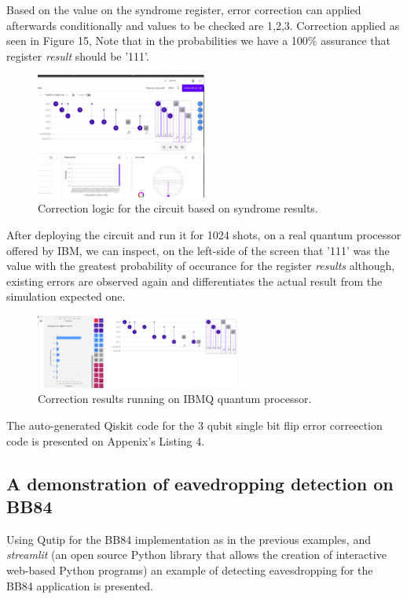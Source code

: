 \documentclass[12pt]{ieeetj}
\begin{document}
		Based on the value on the syndrome register, error correction can applied afterwards conditionally and values to be
		checked are {1,2,3}.
		Correction applied as seen in Figure 15,
		Note that in the probabilities we have a 100\% assurance that register \textit{result} should be '111'.
		\begin{figure}[H]
			\centering
			\includegraphics[width=0.5\textwidth]{ibmq/correction_circ.png}
			\caption{Correction logic for the circuit based on syndrome results.}
			\label{fig15:}
		\end{figure}		
		

		After deploying the circuit and run it for 1024 shots, on a real quantum processor offered by
		IBM, we can inspect, on the left-side of the screen that '111' was the value with the greatest probability
		of occurance for the register \textit{results} although, existing errors are observed again and differentiates the
		actual result from the simulation expected one.
		\begin{figure}[H]
			\centering
			\includegraphics[width=0.6\textwidth]{ibmq/result_correction.png}
			\caption{Correction results running on IBMQ quantum processor.}
			\label{fig15:}
		\end{figure}		
		
		The auto-generated Qiskit code for the 3 qubit single bit flip error correection code is presented on
		Appenix's Listing 4.

		\subsection{A demonstration of eavedropping detection on BB84}
		
		Using Qutip for the BB84 implementation as in the previous examples, and
		\textit{streamlit} (an open source Python library that allows the creation of interactive web-based Python programs)
		an example of detecting eavesdropping for the BB84 application is presented. 
		
\end{document}
